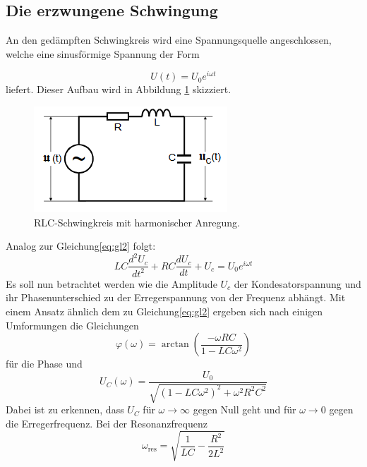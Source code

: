 \subsection{Die erzwungene Schwingung}
An den gedämpften Schwingkreis wird eine Spannungsquelle angeschlossen, welche eine sinusförmige Spannung der Form

\begin{equation*}
  U(t)= U_0 e^{i\omega t}
\end{equation*}
liefert.
Dieser Aufbau wird in Abbildung \ref{fig:erzw} skizziert.
\begin{figure}[H]
    \centering
    \caption{RLC-Schwingkreis mit harmonischer Anregung.\cite{v354}}
    \label{fig:erzw}
    \includegraphics[width=\textwidth-20em]{content/erzwungen.png}
\end{figure}
\noindent
Analog zur Gleichung\eqref{eq:gl2} folgt:
\begin{equation}
  LC\frac{d^2 U_c}{dt^2} +RC \frac{d U_c}{dt}+U_c = U_0 e^{i\omega t}
\end{equation}
Es soll nun betrachtet werden wie die Amplitude $U_c$ der Kondesatorspannung und ihr Phasenunterschied zu der Erregerspannung von der Frequenz abhängt.
Mit einem Ansatz ähnlich dem zu Gleichung\eqref{eq:gl2} ergeben sich nach einigen Umformungen die Gleichungen
\begin{equation}
  \varphi(\omega)=\arctan(\frac{-\omega RC}{1-LC\omega^2})
\end{equation}
für die Phase und
\begin{equation}
  \label{eq:gl7}
  U_C(\omega)=\frac{U_0}{\sqrt{(1-LC\omega^2)^2+\omega^2 R^2 C^2}}
\end{equation}
Dabei ist zu erkennen, dass $U_C$ für $\omega \rightarrow \infty$ gegen Null geht und für $\omega \rightarrow 0$ gegen die Erregerfrequenz.
Bei der Resonanzfrequenz
\begin{equation}
  \omega_\text{res} =\sqrt{\frac{1}{LC}-\frac{R^2}{2L^2}}
\end{equation}
